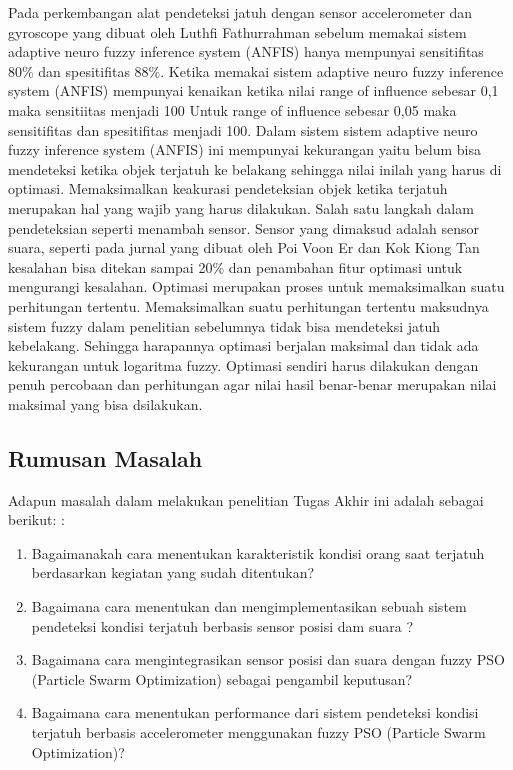 \documentclass[11pt]{article}
\numberwithin{equation}{subsection}
\begin{document}
	Pada perkembangan alat pendeteksi jatuh dengan sensor accelerometer dan gyroscope  yang dibuat oleh Luthfi Fathurrahman sebelum memakai sistem adaptive neuro fuzzy inference system (ANFIS) hanya mempunyai sensitifitas  80\% dan spesitifitas 88\%.
	Ketika memakai sistem adaptive neuro fuzzy inference system (ANFIS) mempunyai kenaikan ketika nilai range of influence sebesar 0,1  maka sensitiitas menjadi 100%
	Untuk range of influence sebesar 0,05  maka sensitifitas dan spesitifitas  menjadi 100.
	Dalam sistem sistem adaptive neuro fuzzy inference system (ANFIS) ini  mempunyai kekurangan yaitu belum bisa mendeteksi ketika objek terjatuh ke belakang sehingga nilai inilah yang harus di optimasi.
	Memaksimalkan keakurasi pendeteksian objek ketika terjatuh merupakan hal yang wajib yang harus dilakukan.
	Salah satu langkah dalam pendeteksian seperti menambah sensor.
	Sensor yang dimaksud adalah sensor suara, seperti pada jurnal yang dibuat oleh  Poi Voon Er dan Kok Kiong Tan kesalahan bisa ditekan sampai 20\% dan penambahan fitur optimasi untuk mengurangi kesalahan.
	Optimasi merupakan proses untuk memaksimalkan suatu perhitungan tertentu.
	Memaksimalkan suatu perhitungan tertentu maksudnya sistem fuzzy dalam penelitian sebelumnya tidak bisa mendeteksi jatuh kebelakang.
	Sehingga harapannya optimasi berjalan maksimal dan tidak ada kekurangan untuk logaritma fuzzy.
	Optimasi sendiri harus dilakukan dengan penuh percobaan dan perhitungan agar nilai hasil benar-benar merupakan nilai maksimal yang bisa dsilakukan.		
	
	\subsection{Rumusan Masalah}
	
		Adapun masalah dalam melakukan penelitian Tugas Akhir ini adalah sebagai berikut: :
	
	\begin{enumerate}[label=\alph*.]
		\item Bagaimanakah cara menentukan karakteristik kondisi orang saat terjatuh berdasarkan kegiatan yang sudah ditentukan?
		\item Bagaimana cara menentukan dan mengimplementasikan sebuah sistem pendeteksi kondisi terjatuh berbasis sensor posisi dam suara ?
		\item Bagaimana cara mengintegrasikan sensor posisi dan suara dengan fuzzy PSO (Particle Swarm Optimization) sebagai pengambil keputusan?
		\item Bagaimana cara menentukan performance dari sistem pendeteksi kondisi terjatuh berbasis accelerometer menggunakan fuzzy PSO (Particle Swarm Optimization)?
	
	\end{enumerate}
	
\end{document}
